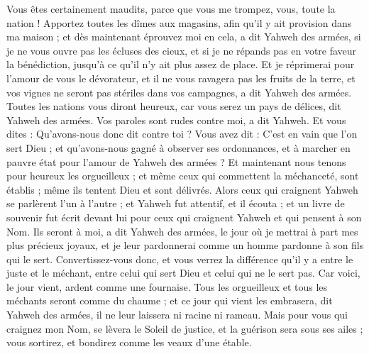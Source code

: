 \begin{multicols}{2}
Vous êtes certainement maudits, parce que vous me trompez, vous, toute la nation !
Apportez toutes les dîmes aux magasins, afin qu'il y ait provision dans ma maison ; et dès maintenant éprouvez moi en cela, a dit Yahweh des armées, si je ne vous ouvre pas les écluses des cieux, et si je ne répands pas en votre faveur la bénédiction, jusqu'à ce qu'il n'y ait plus assez de place.
Et je réprimerai pour l'amour de vous le dévorateur, et il ne vous ravagera pas les fruits de la terre, et vos vignes ne seront pas stériles dans vos campagnes, a dit Yahweh des armées.
Toutes les nations vous diront heureux, car vous serez un pays de délices, dit Yahweh des armées.
Vos paroles sont rudes contre moi, a dit Yahweh. Et vous dites : Qu'avons-nous donc dit contre toi ?
Vous avez dit : C'est en vain que l’on sert Dieu ; et qu'avons-nous gagné à observer ses ordonnances, et à marcher en pauvre état pour l'amour de Yahweh des armées ?
Et maintenant nous tenons pour heureux les orgueilleux ; et même ceux qui commettent la méchanceté, sont établis ; même ils tentent Dieu et sont délivrés.
Alors ceux qui craignent Yahweh se parlèrent l'un à l’autre ; et Yahweh fut attentif, et il écouta ; et un livre de souvenir fut écrit devant lui pour ceux qui craignent Yahweh et qui pensent à son Nom.
Ils seront à moi, a dit Yahweh des armées, le jour où je mettrai à part mes plus précieux joyaux, et je leur pardonnerai comme un homme pardonne à son fils qui le sert.
Convertissez-vous donc, et vous verrez la différence qu'il y a entre le juste et le méchant, entre celui qui sert Dieu et celui qui ne le sert pas.
\VerseOne{}Car voici, le jour vient, ardent comme une fournaise. Tous les orgueilleux et tous les méchants seront comme du chaume ; et ce jour qui vient les embrasera, dit Yahweh des armées, il ne leur laissera ni racine ni rameau.
Mais pour vous qui craignez mon Nom, se lèvera le Soleil de justice, et la guérison sera sous ses ailes ; vous sortirez, et bondirez comme les veaux d’une étable.

\end{multicols}
